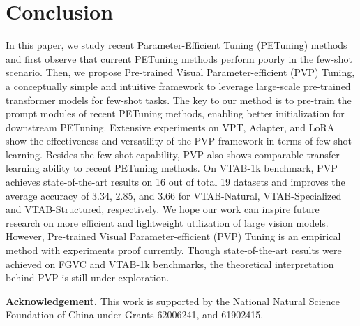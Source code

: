 \documentclass[10pt,journal,letterpaper,compsoc]{IEEEtran}
\newcommand{\myPara}[1]{\vspace{10pt}\noindent\textbf{#1.}\quad}
\begin{document}
\section{Conclusion}
In this paper, we study recent Parameter-Efficient Tuning (PETuning) methods and first observe that current PETuning methods perform poorly in the few-shot scenario. Then, we propose Pre-trained Visual Parameter-efficient (PVP) Tuning, a conceptually simple and intuitive framework to leverage large-scale pre-trained transformer models for few-shot tasks. The key to our method is to pre-train the prompt modules of recent PETuning methods, enabling better initialization for downstream PETuning. Extensive experiments on VPT, Adapter, and LoRA show the effectiveness and versatility of the PVP framework in terms of few-shot learning. Besides the few-shot capability, PVP also shows comparable transfer learning ability to recent PETuning methods. On VTAB-1k benchmark, PVP achieves state-of-the-art results on 16 out of total 19 datasets and improves the average accuracy of 3.34, 2.85, and 3.66 for VTAB-Natural, VTAB-Specialized and VTAB-Structured, respectively. We hope our work can inspire future research on more efficient and lightweight utilization of large vision models. However, Pre-trained Visual Parameter-efficient (PVP) Tuning is an empirical method with experiments proof currently. Though state-of-the-art results were achieved on FGVC and VTAB-1k benchmarks, the theoretical interpretation behind PVP is still under exploration.

\myPara{Acknowledgement}
This work is supported by the National Natural Science Foundation of China under Grants 62006241, and 61902415.


\newpage




\vfill
\end{document}
